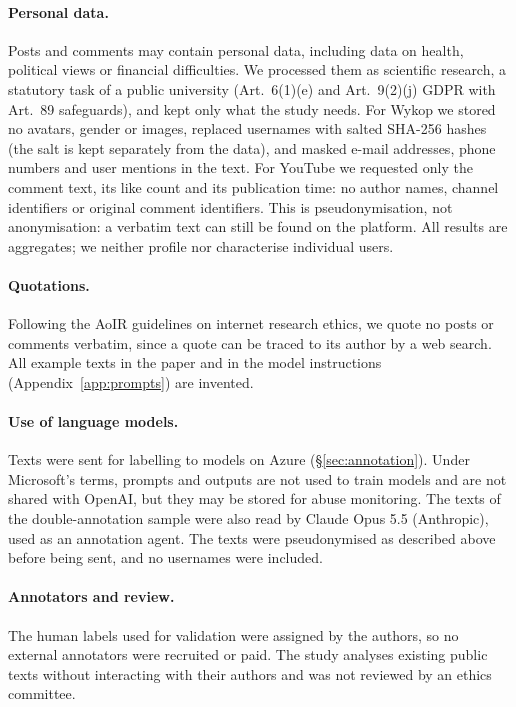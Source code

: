 \documentclass[11pt]{article}
\begin{document}
\paragraph{Personal data.} Posts and comments may contain personal data,
including data on health, political views or financial difficulties. We
processed them as scientific research, a statutory task of a public
university (Art.~6(1)(e) and Art.~9(2)(j) GDPR with Art.~89 safeguards),
and kept only what the study needs. For Wykop we stored no avatars, gender
or images, replaced usernames with salted SHA-256 hashes (the salt is kept
separately from the data), and masked e-mail addresses, phone numbers and
user mentions in the text. For YouTube we requested only the comment text,
its like count and its publication time: no author names, channel
identifiers or original comment identifiers. This is pseudonymisation, not
anonymisation: a verbatim text can still be found on the platform. All results are aggregates; we neither
profile nor characterise individual users.

\paragraph{Quotations.} Following the AoIR guidelines on internet research
ethics, we quote no posts or comments verbatim, since a quote can be traced
to its author by a web search. All example texts in the paper and in the
model instructions (Appendix~\ref{app:prompts}) are invented.

\paragraph{Use of language models.} Texts were sent for labelling to models on
Azure (\S\ref{sec:annotation}). Under Microsoft's terms, prompts and
outputs are not used to train models and are not shared with OpenAI, but
they may be stored for abuse monitoring. The texts of the double-annotation sample were also read by Claude
Opus 5.5 (Anthropic), used as an annotation agent. The texts were
pseudonymised as described above before being sent, and no usernames were
included.

\paragraph{Annotators and review.} The human labels used for validation were
assigned by the authors, so no external annotators were recruited or paid.
The study analyses existing public texts without interacting with their
authors and was not reviewed by an ethics committee.
\end{document}
